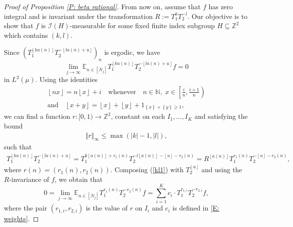 \documentclass[10pt,a4paper]{amsart}
\newcommand{\CI}{{\mathcal I}}
\newcommand{\E}{{\mathbb E}}
\newcommand{\N}{{\mathbb N}}
\newcommand{\Z}{{\mathbb Z}}
\newcommand{\floor}[1]{{\left \lfloor #1 \right \rfloor}}
\newcommand{\norm}[1]{\left\Vert #1\right\Vert}
\newcommand{\rem}[1]{\left \{ #1 \right \}}
\begin{document}
\begin{proof}[Proof of Proposition \ref{P: beta rational}]
From now on, assume that $f$ has zero integral and is invariant under the transformation $R:=T_1^kT_2^{-l}$. Our objective is to show that $f$ is $\CI(H)$-measurable for some fixed finite index subgroup $H\subseteq \Z^2$ {which contains $(k,l)$}.

Since $(T_{1}^{\floor{ka(n)}}T_{2}^{-\floor{la(n)+u}})_{n}$ is ergodic, we have
\begin{equation}\label{kl1}
    \lim_{j\to\infty}\E_{n\in[N_j]}T_{1}^{\floor{ka(n)}}T_{2}^{-\floor{la(n)+u}}f=0
\end{equation}
in $L^2(\mu)$.
Using the identities
\begin{gather*}
 \floor{n x} = n\floor{x} + i \quad\textrm{whenever}\quad n\in\N,\; x\in\left[\frac{i}{n}, \frac{i+1}{n}\right)\\
 \textrm{and}\quad  \floor{x + y}=\floor{x}+\floor{y}+1_{\rem{x}+\rem{y}\geq 1},
\end{gather*}
we can find a function $r:[0,1)\to\Z^2$, constant on each $I_1, \ldots, I_K$ and satisfying the bound
\begin{align}\label{E: bound on r}
\norm{r}_\infty \leq  \max(|k|-1, |l|),    
\end{align}
 such that 
\begin{align*}
    T_{1}^{\floor{ka(n)}}T_{2}^{-\floor{la(n)+u}}=T_{1}^{k\floor{a(n)} + r_1(n)}T_{2}^{-l\floor{a(n)}-\floor{u}-r_2(n)} = R^{\floor{a(n)}}T_1^{r_1(n)}T_2^{-\floor{u}-r_2(n)},
\end{align*}
where $r(n)=(r_1(n), r_2(n))$.
Composing (\ref{kl1}) with $T_2^{\floor{u}}$ and using the $R$-invariance of $f$, we obtain that
\begin{equation}\label{kl2}
    0=\lim_{j\to\infty}\E_{n\in[N_{j}]}T_1^{r_1(n)}T_2^{-r_2(n)}f=\sum_{i=1}^{K}c_{i}\cdot T_1^{r_{1,i}}T_2^{-r_{2,i}} f,
\end{equation}
where %
the pair $(r_{1,i}, r_{2,i})$ is the value of $r$ on $I_i$ and $c_i$ is defined in \eqref{E: weights}.


\end{proof}
\end{document}

